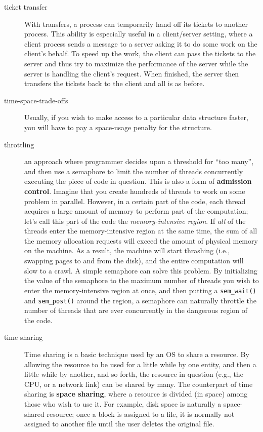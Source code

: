 \begin{description}
\item[ticket transfer] With transfers, a process can temporarily hand off its tickets to another process. This ability is especially useful in a client/server setting, where a client process sends a message to a server asking it to do some work on the client’s behalf. To speed up the work, the client can pass the tickets to the server and thus try to maximize the performance of the server while the server is handling the client’s request. When finished, the server then transfers the tickets back to the client and all is as before.

\item[time-space-trade-offs] Usually, if you wish to make access to a particular data structure faster, you will have to pay a space-usage penalty for the structure.

\item[throttling] an approach where programmer decides upon a threshold for ``too many'', and then use a semaphore to limit the number of threads concurrently executing the piece of code in question.  This is also a form of \textbf{admission control}. Imagine that you create hundreds of threads to work on some problem in parallel. However, in a certain part of the code, each thread acquires a large amount of memory to perform part of the computation; let’s call this part of the code the \emph{memory-intensive region}. If \emph{all} of the threads enter the memory-intensive region at the same time, the sum of all the memory allocation requests will exceed the amount of physical memory on the machine. As a result, the machine will start thrashing (i.e., swapping pages to and from the disk), and the entire computation will slow to a crawl.  A simple semaphore can solve this problem. By initializing the value of the semaphore to the maximum number of threads you wish to enter the memory-intensive region at once, and then putting a \texttt{sem\_wait()} and \texttt{sem\_post()} around the region, a semaphore can naturally throttle the number of threads that are ever concurrently in the dangerous region of the code.

\item[time sharing] Time sharing is a basic technique used by an OS to share a resource. By allowing the resource to be used for a little while by one entity, and then a little while by another, and so forth, the resource in question (e.g., the CPU, or a network link) can be shared by many. The counterpart of time sharing is \textbf{space sharing}, where a resource is divided (in space) among those who wish to use it. For example, disk space is naturally a space-shared resource; once a block is assigned to a file, it is normally not assigned to another file until the user deletes the original file.


\end{description}
